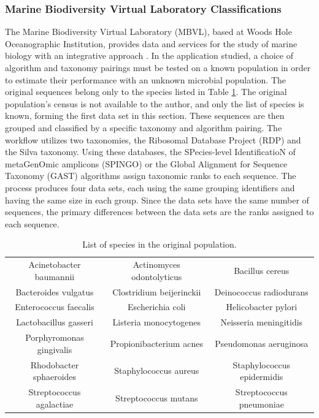 \subsubsection{Marine Biodiversity Virtual Laboratory Classifications} \label{sec:MBVL}

The Marine Biodiversity Virtual Laboratory (MBVL), based at Woods Hole Oceanographic Institution, provides data and services for the study of marine biology with an integrative approach \cite{mbvl}.
In the application studied, a choice of algorithm and taxonomy pairings must be tested on a known population in order to estimate their performance with an unknown microbial population.
The original sequences belong only to the species listed in Table \ref{species_table}.
The original population's census is not available to the author, and only the list of species is known, forming the first data set in this section.
These sequences are then grouped and classified by a specific taxonomy and algorithm pairing.
The workflow utilizes two taxonomies, the Ribosomal Database Project (RDP) and the Silva taxonomy.
Using these databases, the SPecies-level IdentificatioN of metaGenOmic amplicons (SPINGO) or the Global Alignment for Sequence Taxonomy (GAST) algorithms assign taxonomic ranks to each sequence.
The process produces four data sets, each using the same grouping identifiers and having the same size in each group.
Since the data sets have the same number of sequences, the primary differences between the data sets are the ranks assigned to each sequence.

\begin{table}
	\caption{List of species in the original population.}
	\label{species_table}
	\centering
	\setlength{\tabcolsep}{2pt}
	\begin{tabular}{|c|c|c|}
		\hline
		Acinetobacter baumannii & Actinomyces odontolyticus & Bacillus cereus \\
		Bacteroides vulgatus & Clostridium beijerinckii & Deinococcus radiodurans \\
		Enterococcus faecalis & Escherichia coli & Helicobacter pylori \\
		Lactobacillus gasseri & Listeria monocytogenes & Neisseria meningitidis\\
		Porphyromonas gingivalis & Propionibacterium acnes & Pseudomonas aeruginosa \\
		Rhodobacter sphaeroides & Staphylococcus aureus & Staphylococcus epidermidis\\
		Streptococcus agalactiae & Streptococcus mutans & Streptococcus pneumoniae \\
		\hline
	\end{tabular}
\end{table}

